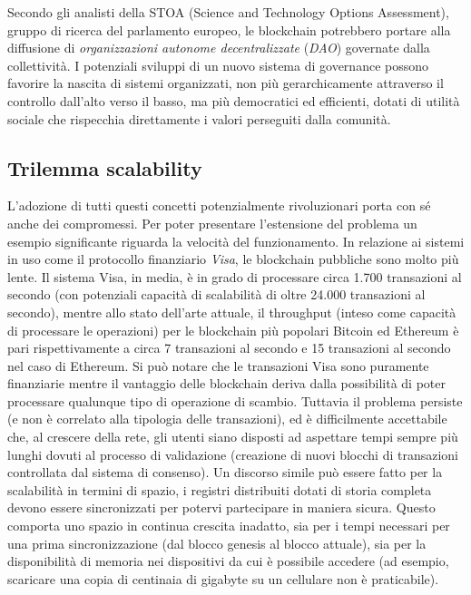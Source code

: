 Secondo gli analisti della STOA (Science and Technology Options Assessment), gruppo di ricerca del parlamento europeo, le blockchain potrebbero portare alla diffusione di \emph{organizzazioni autonome decentralizzate} (\emph{DAO}) governate dalla collettività. I potenziali sviluppi di un nuovo sistema di governance possono favorire la nascita di sistemi organizzati, non più gerarchicamente attraverso il controllo dall’alto verso il basso, ma più democratici ed efficienti, dotati di utilità sociale che rispecchia direttamente i valori perseguiti dalla comunità.

\subsection{Trilemma scalability}

L'adozione di tutti questi concetti potenzialmente rivoluzionari porta con sé anche dei compromessi. Per poter presentare l’estensione del problema un esempio significante riguarda la velocità del funzionamento. In relazione ai sistemi in uso come il protocollo finanziario \emph{Visa}, le blockchain pubbliche sono molto più lente. Il sistema Visa, in media, è in grado di processare circa 1.700 transazioni al secondo (con potenziali capacità di scalabilità di oltre 24.000 transazioni al secondo), mentre allo stato dell’arte attuale, il throughput (inteso come capacità di processare le operazioni) per le blockchain più popolari Bitcoin ed Ethereum è pari rispettivamente a circa 7 transazioni al secondo e 15 transazioni al secondo nel caso di Ethereum. Si può notare che le transazioni Visa sono puramente finanziarie mentre il vantaggio delle blockchain deriva dalla possibilità di poter processare qualunque tipo di operazione di scambio. Tuttavia il problema persiste (e non è correlato alla tipologia delle transazioni), ed è difficilmente accettabile che, al crescere della rete, gli utenti siano disposti ad aspettare tempi sempre più lunghi dovuti al processo di validazione (creazione di nuovi blocchi di transazioni controllata dal sistema di consenso). Un discorso simile può essere fatto per la scalabilità in termini di spazio, i registri distribuiti dotati di storia completa devono essere sincronizzati per potervi partecipare in maniera sicura. Questo comporta uno spazio in continua crescita inadatto, sia per i tempi necessari per una prima sincronizzazione (dal blocco genesis al blocco attuale), sia per la disponibilità di memoria nei dispositivi da cui è possibile accedere (ad esempio, scaricare una copia di centinaia di gigabyte su un cellulare non è praticabile). 

